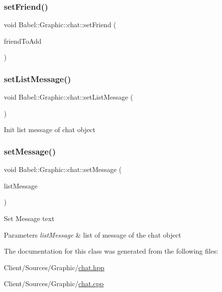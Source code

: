 \subsubsection{\texorpdfstring{set\+Friend()}{setFriend()}}
{\footnotesize\ttfamily void Babel\+::\+Graphic\+::chat\+::set\+Friend (\begin{DoxyParamCaption}\item[{std\+::string}]{friend\+To\+Add }\end{DoxyParamCaption})\hspace{0.3cm}{\ttfamily [inline]}}

\mbox{\label{classBabel_1_1Graphic_1_1chat_a3d938faf192392802b0d0cfa8d7b6d96}} 
\subsubsection{\texorpdfstring{set\+List\+Message()}{setListMessage()}}
{\footnotesize\ttfamily void Babel\+::\+Graphic\+::chat\+::set\+List\+Message (\begin{DoxyParamCaption}{ }\end{DoxyParamCaption})}

Init list message of chat object \mbox{\label{classBabel_1_1Graphic_1_1chat_ab49a30ce08e52838463f420aa1637b37}} 
\subsubsection{\texorpdfstring{set\+Message()}{setMessage()}}
{\footnotesize\ttfamily void Babel\+::\+Graphic\+::chat\+::set\+Message (\begin{DoxyParamCaption}\item[{Q\+List$<$ \hyperlink{classBabel_1_1Graphic_1_1message}{message} $>$}]{list\+Message }\end{DoxyParamCaption})}

Set Message text 
\begin{DoxyParams}{Parameters}
{\em list\+Message} & list of message of the chat object \\
\hline
\end{DoxyParams}


The documentation for this class was generated from the following files\+:\begin{DoxyCompactItemize}
\item 
Client/\+Sources/\+Graphic/\hyperlink{chat_8hpp}{chat.\+hpp}\item 
Client/\+Sources/\+Graphic/\hyperlink{chat_8cpp}{chat.\+cpp}\end{DoxyCompactItemize}
